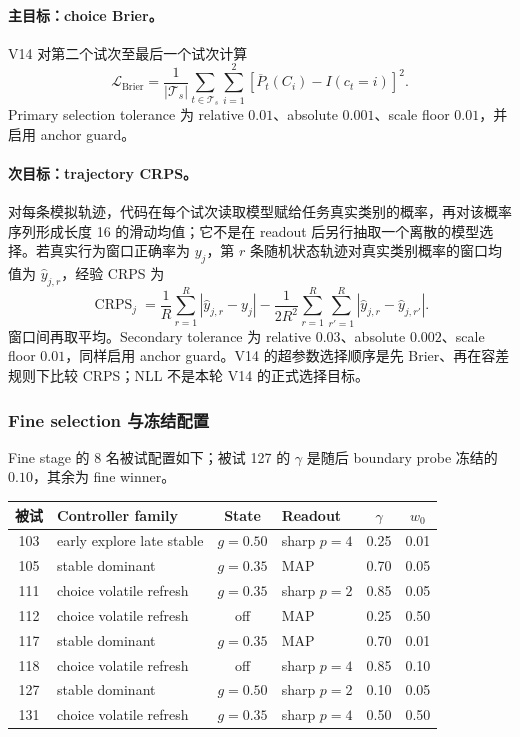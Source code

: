 \paragraph{主目标：choice Brier。}
V14 对第二个试次至最后一个试次计算
\begin{equation}
    \mathcal L_{\mathrm{Brier}}
    =
    \frac{1}{|\mathcal T_s|}
    \sum_{t\in\mathcal T_s}
    \sum_{i=1}^{2}
    \left[
        \overline P_t(C_i)
        -
        I(c_t=i)
    \right]^2.
    \label{eq:modelv14-brier}
\end{equation}
Primary selection tolerance 为 relative $0.01$、absolute $0.001$、scale floor $0.01$，并启用 anchor guard。

\paragraph{次目标：trajectory CRPS。}
对每条模拟轨迹，代码在每个试次读取模型赋给任务真实类别的概率，再对该概率序列形成长度 16 的滑动均值；它不是在 readout 后另行抽取一个离散的模型选择。若真实行为窗口正确率为 $y_j$，第 $r$ 条随机状态轨迹对真实类别概率的窗口均值为 $\widehat y_{j,r}$，经验 CRPS 为
\begin{equation}
    \operatorname{CRPS}_j
    =
    \frac{1}{R}
    \sum_{r=1}^{R}
    |\widehat y_{j,r}-y_j|
    -
    \frac{1}{2R^2}
    \sum_{r=1}^{R}
    \sum_{r'=1}^{R}
    |\widehat y_{j,r}-\widehat y_{j,r'}|.
    \label{eq:modelv14-crps}
\end{equation}
窗口间再取平均。Secondary tolerance 为 relative $0.03$、absolute $0.002$、scale floor $0.01$，同样启用 anchor guard。V14 的超参数选择顺序是先 Brier、再在容差规则下比较 CRPS；NLL 不是本轮 V14 的正式选择目标。


\subsubsection{Fine selection 与冻结配置}

Fine stage 的 8 名被试配置如下；被试 127 的 $\gamma$ 是随后 boundary probe 冻结的 $0.10$，其余为 fine winner。

\begin{center}
\small
\begin{tabular}{c|l|c|l|c|c}
被试 & Controller family & State & Readout & $\gamma$ & $w_0$\\
\hline
103 & early explore late stable & $g=0.50$ & sharp $p=4$ & 0.25 & 0.01\\
105 & stable dominant & $g=0.35$ & MAP & 0.70 & 0.05\\
111 & choice volatile refresh & $g=0.35$ & sharp $p=2$ & 0.85 & 0.05\\
112 & choice volatile refresh & off & MAP & 0.25 & 0.50\\
117 & stable dominant & $g=0.35$ & MAP & 0.70 & 0.01\\
118 & choice volatile refresh & off & sharp $p=4$ & 0.85 & 0.10\\
127 & stable dominant & $g=0.50$ & sharp $p=2$ & 0.10 & 0.05\\
131 & choice volatile refresh & $g=0.35$ & sharp $p=4$ & 0.50 & 0.50\\
\end{tabular}
\end{center}

